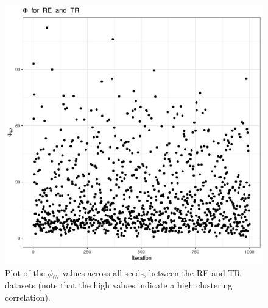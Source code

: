 \documentclass[12pt]{article} %
\begin{document}
	\newpage
	
	\begin{figure}[h]
		\centering
		\includegraphics[scale=0.75]{Images/Biology_data/Set_250/All_datasets/Phi_series_plots/file_1_Phi_67.png}
		\caption{Plot of the $\phi_{67}$ values across all seeds, between the RE and TR datasets (note that the high values indicate a high clustering correlation).}
		\label{fig:results:cedar_1:mdi_re_tr_phi_series_plot}
	\end{figure}

	\newpage
	
\end{document}
